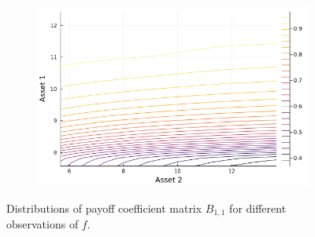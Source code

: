 \documentclass{article}
\begin{document}
\begin{figure}
\begin{subfigure}{0.4\textwidth}
    \end{subfigure}
    \begin{subfigure}{0.4\textwidth}
        \includegraphics[width=\textwidth]{../plots/params/more-corr-meanvarshift/b11.png}
    \end{subfigure}
    \caption{Distributions of payoff coefficient matrix $B_{1,1}$ for different observations of $f$.}
    \label{fig:b11}
\end{figure}
\end{document}

